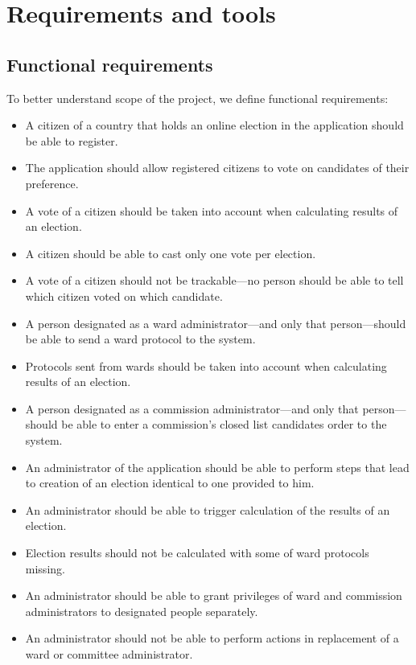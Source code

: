 \documentclass[a4paper,twoside,12pt]{book}
\begin{document}
\chapter{Requirements and tools}

  \section{Functional requirements}
    To better understand scope of the project, we define functional requirements:
    \begin{itemize}
      \item A citizen of a country that holds an online election in the application should be able to register.
      \item The application should allow registered citizens to vote on candidates of their preference.
      \item A vote of a citizen should be taken into account when calculating results of an election.
      \item A citizen should be able to cast only one vote per election.
      \item A vote of a citizen should not be trackable---no person should be able to tell which citizen voted on which candidate.
      \item A person designated as a ward administrator---and only that person---should be able to send a ward protocol to the system.
      \item Protocols sent from wards should be taken into account when calculating results of an election.
      \item A person designated as a commission administrator---and only that person---should be able to enter a commission's closed list candidates order to the system.
      \item An administrator of the application should be able to perform steps that lead to creation of an election identical to one provided to him.
      \item An administrator should be able to trigger calculation of the results of an election.
      \item Election results should not be calculated with some of ward protocols missing.
      \item An administrator should be able to grant privileges of ward and commission administrators to designated people separately.
      \item An administrator should not be able to perform actions in replacement of  a ward or committee administrator.
    \end{itemize}
\end{document}
